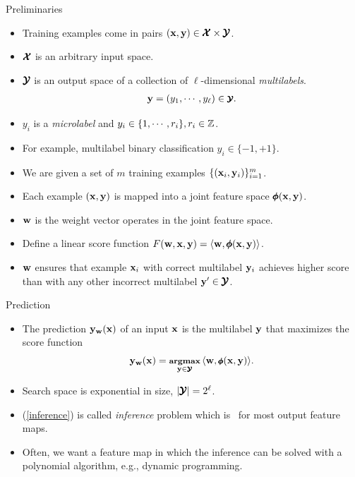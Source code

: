 \documentclass[first=dgreen,second=purple,logo=red]{aaltoslides}
\begin{document}
%
\begin{frame}{Preliminaries}
	\begin{itemize}\footnotesize
		\item Training examples come in pairs $(\mathbf {x},\mathbf {y})\in\pmb {\mathcal{X}}\times\pmb {\mathcal{Y}}$.
		\item $\pmb {\mathcal{X}}$ is an arbitrary input space.
		\item $\pmb {\mathcal{Y}}$ is an output space of a collection of $\ell$-dimensional {\em multilabels}.
		\begin{align*}\footnotesize
			\mathbf {y}=(y_1,\cdots,y_{\ell})\in\pmb {\mathcal{Y}}.
		\end{align*}
		\item $y_i$ is a {\em microlabel} and $y_i\in\{1,\cdots,r_i\}, r_i\in\mathbb{Z}$.
		\item For example, multilabel binary classification $y_i\in\{-1,+1\}$.
		\item We are given a set of $m$ training examples $\{(\mathbf {x}_i,\mathbf {y}_i)\}_{i=1}^m$.
		\item Each example $(\mathbf {x},\mathbf {y})$ is mapped into a joint feature space $\pmb \phi(\mathbf {x},\mathbf {y})$.
		\item $\mathbf {w}$ is the weight vector operates in the joint feature space.
		\item Define a linear score function $F(\mathbf {w},\mathbf {x},\mathbf {y}) = \langle \mathbf {w}, \pmb \phi(\mathbf {x},\mathbf {y}) \rangle$.
		\item $\mathbf {w}$ ensures that example $\mathbf {x}_i$ with correct multilabel $\mathbf {y}_i$ achieves higher score than with any other incorrect multilabel $\mathbf {y}'\in\pmb {\mathcal{Y}}$.
	\end{itemize}
\end{frame}

\begin{frame}{Prediction}
	\begin{itemize}
		\item The prediction $\mathbf {y}_{\mathbf {w}}(\mathbf {x})$ of an input $\mathbf {x}$ is the multilabel $\mathbf {y}$ that maximizes the score function 
		\begin{align}\footnotesize
			\mathbf {y}_{\mathbf {w}}(\mathbf {x}) = \underset{\mathbf {y}\in\pmb {\mathcal{Y}}}{\textbf{argmax}}\,\langle \mathbf {w}, \pmb \phi(\mathbf {x},\mathbf {y}) \rangle. \label{inference}
		\end{align}
		\item Search space is exponential in size, $|\pmb {\mathcal{Y}}|=2^{\ell}$.
		\item (\ref{inference}) is called {\em inference} problem which is \nphard\ for most output feature maps.
		\item Often, we want a feature map in which the inference can be solved with a polynomial algorithm, e.g., dynamic programming.
	\end{itemize}
\end{frame}
\end{document}
